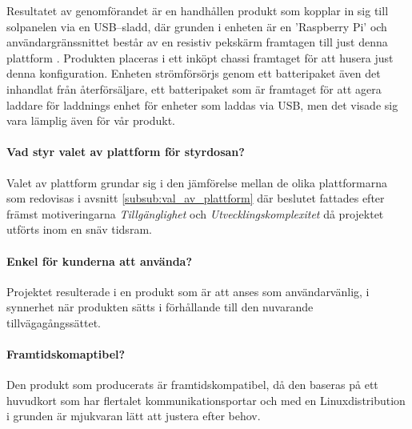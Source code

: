 \documentclass{article}
\begin{document}
        \noindent Resultatet av genomförandet är en handhållen produkt som kopplar in sig till sol\-panel\-en via en USB--sladd, där grunden i enheten är en 'Raspberry Pi' och användargränssnittet består av en resistiv pekskärm framtagen till just denna plattform \cite{Ada}. Produkten placeras i ett inköpt chassi framtaget för att husera just denna konfiguration. Enheten strömförsörjs genom ett batteripaket även det inhandlat från återförsäljare, ett batteripaket som är framtaget för att agera laddare för laddnings enhet för enheter som laddas via USB, men det visade sig vara lämplig även för vår produkt.

        \paragraph{\textrm{Vad styr valet av plattform för styrdosan?}} %
        \label{par:vad_styr_valet}
            Valet av plattform grundar sig i den jämförelse mellan de olika plattformarna som redovisas i avsnitt \ref{subsub:val_av_plattform} där beslutet fattades efter främst motiveringarna \emph{Tillgänglighet} och \emph{Utvecklingskomplexitet} då projektet utförts inom en snäv tidsram.

        \paragraph{\textrm{Enkel för kunderna att använda?}} %
        \label{par:enk}
            Projektet resulterade i en produkt som är att anses som användarvänlig, i synnerhet när produkten sätts i förhållande till den nuvarande tillväga\-gångs\-sättet.

        \paragraph{\textrm{Framtidskomaptibel?}} %
        \label{par:framtidskomaptibel}
            Den produkt som producerats är framtidskompatibel, då den baseras på ett huvudkort som har flertalet kommunikationsportar och med en Linux\-distribution i grunden är mjukvaran lätt att justera efter behov.
      
\end{document}
